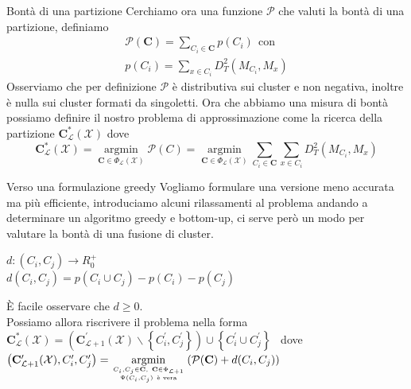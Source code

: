 \documentclass[usenames,dvipsnames,9pt]{beamer}
\theoremstyle{definition}
\begin{document}
\begin{frame}{Bontà di una partizione}
Cerchiamo ora una funzione $\mathcal{P}$ che valuti la bontà di una partizione, definiamo
\begin{equation*}
\begin{gathered}
	\mathcal{P}(\textbf{C}) = \sum_{C_i\in\textbf{C}}p(C_i) \ \ \text{con} \\
	p(C_i) = \sum_{x\in C_i}D^{2}_T(M_{C_i}, M_x)
\end{gathered}
\end{equation*}
Osserviamo che per definizione $\mathcal{P}$ è distributiva sui cluster e non negativa, inoltre è nulla sui cluster formati da singoletti.
Ora che abbiamo una misura di bontà possiamo definire il nostro problema di approssimazione come la ricerca della partizione $\mathbf{C}_{\mathcal{L}}^{*}(\mathcal{X})$ dove
\begin{equation*}
\mathbf{C}_{\mathcal{L}}^{*}(\mathcal{X})=\underset{\mathbf{C} \in \Phi_{\mathcal{L}}(\mathcal{X})}{\operatorname{argmin}} \mathcal{P}(C)= \underset{\mathbf{C} \in \Phi_{\mathcal{L}}(\mathcal{X})}{\operatorname{argmin}} \sum_{C_{i} \in \mathbf{C}} \sum_{x \in C_{i}} D_{T}^{2}\left(M_{C_{i}}, M_{x}\right)
\end{equation*}
\end{frame}

\begin{frame}{Verso una formulazione greedy}
Vogliamo formulare una versione meno accurata ma più efficiente,
introduciamo alcuni rilassamenti al problema andando a determinare un algoritmo greedy e bottom-up, ci serve però un modo per valutare la bontà di una fusione di cluster.
\begin{definition}
$d:(C_i, C_j)\to R^{+}_0$ \\
$d(C_i, C_j) = p(C_i\cup C_j) - p(C_i) - p(C_j)$
\end{definition}
È facile osservare che $d\geq 0$. \\

Possiamo allora riscrivere il problema nella forma
$\mathbf{C}_{\mathcal{L}}^{*}(\mathcal{X})=\left(\mathbf{C}_{\mathcal{L}+1}^{\prime}(\mathcal{X}) \backslash\left\{C_{i}^{\prime}, C_{j}^{\prime}\right\}\right) \cup\left\{C_{i}^{\prime} \cup C_{j}^{\prime}\right\}$ \ dove \\
$\left(\mathbf{C}_{\mathcal{L}+1}^\prime(\mathcal{X}), C_{i}^{\prime}, C_{j}^{\prime}\right)=\underset{C_{i}, C_{j} \in \mathbf{C}, \ \mathbf{C} \in \Phi_{\mathcal{L}+1} \atop \Psi(C_i, C_j) \ \text{è vera}}{\operatorname{argmin}}\left(\mathcal{P}(\mathbf{C})+d(C_{i}, C_{j})\right)$
\end{frame}
\end{document}
